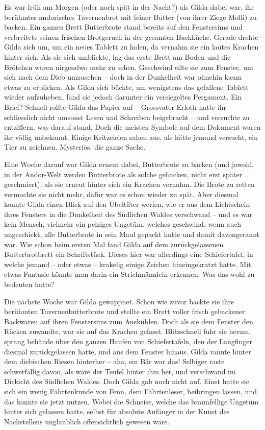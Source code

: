 
Es war früh am Morgen (oder noch spät in der Nacht?) als Gilda dabei war, ihr berühmtes andorisches Tavernenbrot mit feiner Butter (von ihrer Ziege Molli) zu backen. Ein ganzes Brett Butterbrote stand bereits auf den Fenstersims und verbreitete seinen frischen Brotgeruch in der gesamten Backküche. Gerade drehte Gilda sich um, um ein neues Tablett zu holen, da vernahm sie ein lautes Krachen hinter sich. Als sie sich umblickte, lag das erste Brett am Boden und die Brötchen waren nirgendwo mehr zu sehen. Geschwind eilte sie zum Fenster, um sich nach dem Dieb umzusehen – doch in der Dunkelheit war ohnehin kaum etwas zu erblicken. Als Gilda sich bückte, um wenigstens das gefallene Tablett wieder aufzuheben, fand sie jedoch darunter ein versiegeltes Pergament. Ein Brief? Schnell rollte Gilda das Papier auf – Grossvater Erloth hatte ihr schliesslich nicht umsonst Lesen und Schreiben beigebracht – und versuchte zu entziffern, was darauf stand. Doch die meisten Symbole auf dem Dokument waren ihr völlig unbekannt. Einige Kritzeleien sahen aus, als hätte jemand versucht, ein Tier zu zeichnen. Mysteriös, die ganze Sache.

Eine Woche darauf war Gilda erneut dabei, Butterbrote zu backen (und jawohl, in der Andor-Welt werden Butterbrote als solche gebacken, nicht erst später geschmiert), als sie erneut hinter sich ein Krachen vernahm. Die Brote zu retten vermochte sie nicht mehr, dafür war es schon wieder zu spät. Aber diesmal konnte Gilda einen Blick auf den Übeltäter werfen, wie er aus dem Lichtschein ihres Fensters in die Dunkelheit des Südlichen Waldes verschwand – und es war kein Mensch, vielmehr ein pelziges Ungetüm, welches geschwind, wenn auch ungeschickt, alle Butterbrote in sein Maul gepackt hatte und damit davongerannt war. Wie schon beim ersten Mal fand Gilda auf dem zurückgelassenen Butterbrotbrett ein Schriftstück. Dieses hier war allerdings eine Schiefertafel, in welche jemand – oder etwas – krakelig einige Zeichen hineingekratzt hatte. Mit etwas Fantasie könnte man darin ein Strichmännlein erkennen. Was das wohl zu bedeuten hatte?

Die nächste Woche war Gilda gewappnet. Schon wie zuvor backte sie ihre berühmten Tavernenbutterbrote und stellte ein Brett voller frisch gebackener Backwaren auf ihren Fenstersims zum Auskühlen. Doch als sie dem Fenster den Rücken zuwandte, war sie auf das Krachen gefasst. Blitzschnell fuhr sie herum, sprang behände über den ganzen Haufen von Schiefertafeln, den der Langfinger diesmal zurückgelassen hatte, und aus dem Fenster hinaus. Gilda rannte hinter dem diebischen Riesen hinterher – aha, ein Bär war das! Selbiger raste schwerfällig davon, als wäre der Teufel hinter ihm her, und verschwand im Dickicht des Südlichen Waldes. Doch Gilda gab noch nicht auf. Einst hatte sie sich ein wenig Fährtenkunde von Fenn, dem Fährtenleser, beibringen lassen, und das konnte sie jetzt nutzen. Wobei die Schneise, welche das braunfellige Ungetüm hinter sich gelassen hatte, selbst für absolute Anfänger in der Kunst des Nachstellens unglaublich offensichtlich gewesen wäre.

